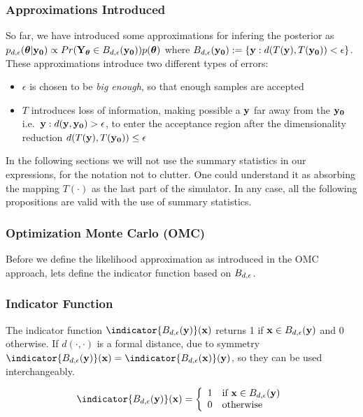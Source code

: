 \subsubsection{Approximations Introduced}

So far, we have introduced some approximations for infering the
posterior as
$p_{d,\epsilon}(\boldsymbol{\theta}|\mathbf{y_0}) \propto Pr(\mathbf{Y}_{\boldsymbol{\theta}} \in
B_{d,\epsilon}(\mathbf{y_0}))p(\boldsymbol{\theta})$ where
$B_{d,\epsilon}(\mathbf{y_0}) := \{\mathbf{y}: d(T(\mathbf{y}), T(\mathbf{y_0})) < \epsilon \}$. These
approximations introduce two different types of errors:

\begin{itemize}
\item $\epsilon$ is chosen to be \textit{big enough}, so that enough
  samples are accepted
\item $T$ introduces loss of information, making possible a $\mathbf{y}$ far
  away from the $\mathbf{y_0}$ i.e.\ $\mathbf{y}: d(\mathbf{y},\mathbf{y_0})>\epsilon$, to enter
  the acceptance region after the dimensionality reduction
  $d(T(\mathbf{y}), T(\mathbf{y_0})) \leq \epsilon$
\end{itemize}

\noindent
In the following sections we will not use the summary statistics in
our expressions, for the notation not to clutter. One could understand
it as absorbing the mapping $T(\cdot)$ as the last part of the
simulator. In any case, all the following propositions are valid with
the use of summary statistics.
  
\subsubsection{Optimization Monte Carlo (OMC)}

Before we define the likelihood approximation as introduced in the OMC
approach, lets define the indicator function based on $B_{d,\epsilon}$.

\subsubsection*{Indicator Function}

The indicator function $\indicator{\region(\yb)}(\xb)$ returns 1 if
$\mathbf{x} \in B_{d,\epsilon}(\mathbf{y})$ and 0 otherwise. If $d(\cdot,\cdot)$ is a
formal distance, due to symmetry
$\indicator{\region(\yb)}(\xb) = \indicator{\region(\xb)}(\yb)$, so
they can be used interchangeably.

\begin{gather} \label{eq:indicator} \indicator{\region(\yb)}(\xb)=
  \left\{
    \begin{array}{ll}
      1 & \mbox{if } \xb \in \region(\yb) \\
      0 & \mbox{otherwise} 
    \end{array} \right. \end{gather}

